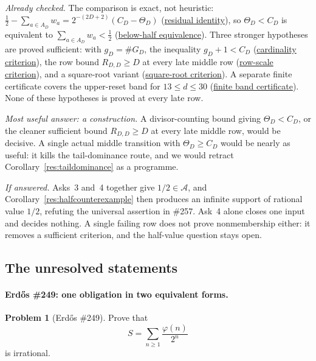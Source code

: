 \documentclass[11pt]{article}
\newcommand{\commit}{bb4e24651b37cd096d3749ef299c3317930b3a3b}
\newcommand{\repobase}{https://github.com/wcook04/plectis-lean-erdos249-257/blob/\commit}
\newcommand{\PK}{Erdos249257}
\newcommand{\lword}[4]{\href{\repobase/\PK/#1\#L#2}{#4}}
\theoremstyle{definition}
\newtheorem{problem}[theorem]{Problem}
\theoremstyle{remark}
\newcommand{\ph}{\varphi}
\begin{document}
\emph{Already checked.}  The comparison is exact, not heuristic:
\(\tfrac12-\sum_{a\in A_D}w_a=2^{-(2D+2)}(C_D-\Theta_D)\)
(\lword{HalfCylinderProducerCarrySocket.lean}{27}{producerCarry_residual_identity}{residual identity}),
so \(\Theta_D<C_D\) is equivalent to \(\sum_{a\in A_D}w_a<\tfrac12\)
(\lword{HalfCylinderProducerCarrySocket.lean}{48}{producerCarry_gt_tail_iff_supportSeries_lt_half}{below-half equivalence}).
Three stronger hypotheses are proved sufficient: with \(g_D=\#G_D\), the
inequality \(g_D+1<C_D\)
(\lword{HalfCylinderMiddleCarryLowerBound.lean}{2364}{half_mem_mersenneAchievementSet_of_middleProducerCardEscape}{cardinality criterion}),
the row bound \(R_{D,D}\ge D\) at every late middle row
(\lword{HalfCylinderMiddleCarryLowerBound.lean}{2371}{half_mem_mersenneAchievementSet_of_middleProducerRowEscape}{row-scale criterion}),
and a square-root variant
(\lword{HalfCylinderLastProducerContradiction.lean}{458}{half_mem_mersenneAchievementSet_of_middleProducerSqrtEscape}{square-root criterion}).
A separate finite certificate covers the upper-reset band for
\(13\le d\le30\)
(\lword{HalfCylinderUpperResetBandCertificates.lean}{78}{seamUpperResetDyadicBandEscape_through_thirty}{finite band certificate}).
None of these hypotheses is proved at every late row.

\emph{Most useful answer: a construction.}  A divisor-counting bound giving
\(\Theta_D<C_D\), or the cleaner sufficient bound \(R_{D,D}\ge D\) at every
late middle row, would be decisive.  A single actual middle transition with
\(\Theta_D\ge C_D\) would be nearly as useful: it kills the tail-dominance
route, and we would retract Corollary~\ref{res:taildominance} as a
programme.

\emph{If answered.}  Asks~3 and~4 together give \(1/2\in\mathcal A\), and
Corollary~\ref{res:halfcounterexample} then produces an infinite support of
rational value \(1/2\), refuting the universal assertion in \#257.  Ask~4
alone closes one input and decides nothing.  A single failing row does not
prove nonmembership either: it removes a sufficient criterion, and the
half-value question stays open.

\subsection{The unresolved statements}\label{sec:unresolved}

\paragraph{Erd\H{o}s \#249: one obligation in two equivalent forms.}
\begin{problem}[Erd\H{o}s \#249]
Prove that
\[
S=\sum_{n\ge1}\frac{\ph(n)}{2^n}
\]
is irrational.
\end{problem}
\end{document}
